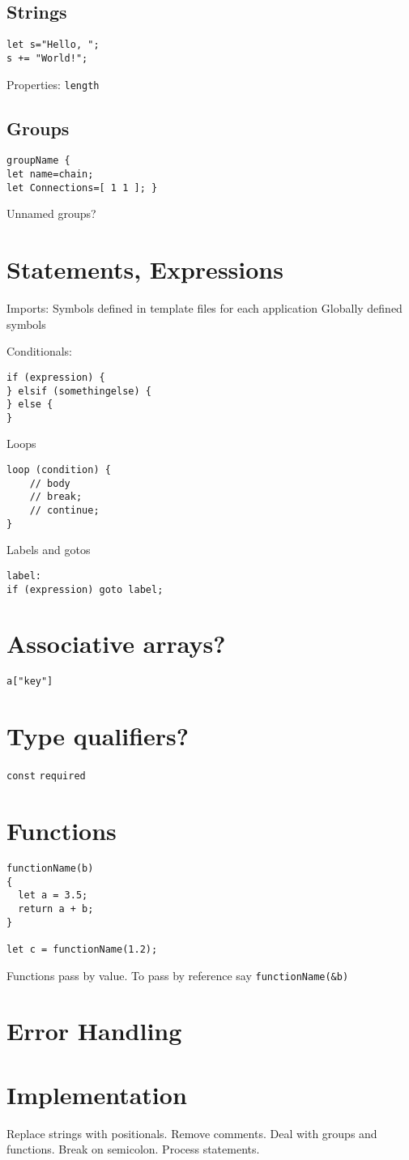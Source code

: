 \documentclass[twocolumn]{article}
\begin{document}
\subsection{Strings} 
\begin{verbatim}
let s="Hello, ";
s += "World!";
\end{verbatim}
Properties: \verb!length!

\subsection{Groups} 
\begin{verbatim}
groupName {
let name=chain;
let Connections=[ 1 1 ]; }
\end{verbatim}
Unnamed groups?

\section{Statements, Expressions}
Imports: Symbols defined in template files for each application
Globally defined symbols

Conditionals:
\begin{verbatim}
if (expression) {
} elsif (somethingelse) {
} else {
}
\end{verbatim}
Loops
\begin{verbatim}
loop (condition) {
	// body
	// break;
	// continue;
}
\end{verbatim}

Labels and gotos
\begin{verbatim}
label:
if (expression) goto label;
\end{verbatim}
\section{Associative arrays?}
\verb!a["key"]!

\section{Type qualifiers?}
\verb!const! \verb!required!

\section{Functions}
\begin{verbatim}
functionName(b)
{
  let a = 3.5;
  return a + b;
}

let c = functionName(1.2);
\end{verbatim}
Functions pass by value. To pass by reference say \verb!functionName(&b)!

\section{Error Handling}

\section{Implementation}
Replace strings with positionals.
Remove comments.
Deal with groups and functions.
Break on semicolon.
Process statements.
\end{document}
